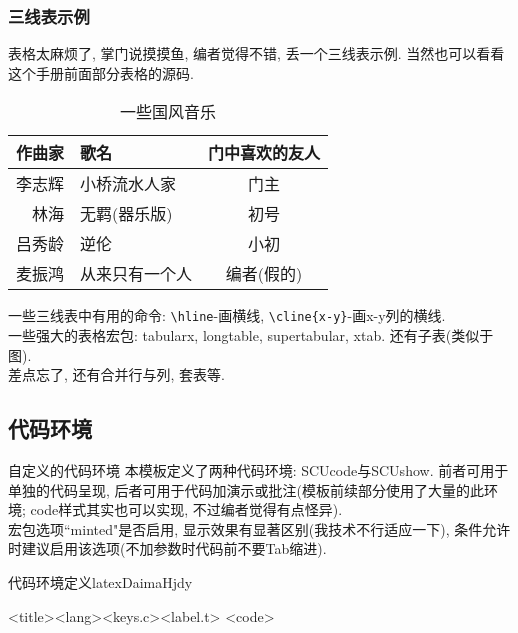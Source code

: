 \documentclass[hyperref,UTF8,11pt]{beamer}
\begin{document}
\cprotEnv\begin{frame}
	\frametitle{三线表示例}
	表格太麻烦了, 掌门说摸摸鱼, 编者觉得不错, 丢一个三线表示例. 当然也可以看看这个手册前面部分表格的源码.
	\begin{table}[htbp]
		\centering
		\caption{一些国风音乐}
		\label{tab:YixieGfyy}
		\begin{tabular}{rlc}
			\toprule
			作曲家 & 歌名 & 门中喜欢的友人 \\
			\midrule
			李志辉 & 小桥流水人家 & 门主 \\
			林海 & 无羁(器乐版) & 初号 \\
			吕秀龄 & 逆伦 & 小初 \\
			麦振鸿 & 从来只有一个人 & 编者(假的) \\
			\bottomrule
		\end{tabular}
	\end{table}
	一些三线表中有用的命令: \verb|\hline|-画横线, \verb|\cline|\verb!{x-y}!-画x-y列的横线.\\
	一些强大的表格宏包: tabularx, longtable, supertabular, xtab. 还有子表(类似于图).\\
	差点忘了, 还有合并行与列, 套表等.
\end{frame}

\subsection{代码环境}
\begin{frame}[fragile]{自定义的代码环境}
	本模板定义了两种代码环境: {\color{JXred}SCUcode}与{\color{JXred}SCUshow}. 前者可用于单独的代码呈现, 后者可用于代码加演示或批注(模板前续部分使用了大量的此环境; code样式其实也可以实现, 不过编者觉得有点怪异).\\
	宏包选项``minted"是否启用, 显示效果有显著区别(我技术不行适应一下), 条件允许时建议启用该选项({\color{JXred}不加参数时代码前不要Tab缩进}).
	\begin{SCUshow}[comment={%
			\scriptsize%
			{\color{JXred}<envi>}\quad SCUcode或SCUshow\\
			{\color{JXred}<keys.t>}\quad 添加到tcolorbox中的参数, 如comment, sidebyside等\\
			{\color{JXred}<title>}\quad 标题\\
			{\color{JXred}<lang>}\quad 代码语言\\
			{\color{JXred}<keys.c>}\quad 添加到minted或listings中的参数\\
			{\color{JXred}<label.t>}\quad 引用标签尾部, 头部已定义(code:)\\
			{\color{JXred}<code>}\quad 代码\\
		},%
		listing above comment]{代码环境定义}{latex}{}{DaimaHjdy}
		\begin{<envi>}[<keys.t>]{<title>}{<lang>}{<keys.c>}{<label.t>}
			<code>
		\end{<envi>}
	\end{SCUshow}
\end{frame}
\end{document}
